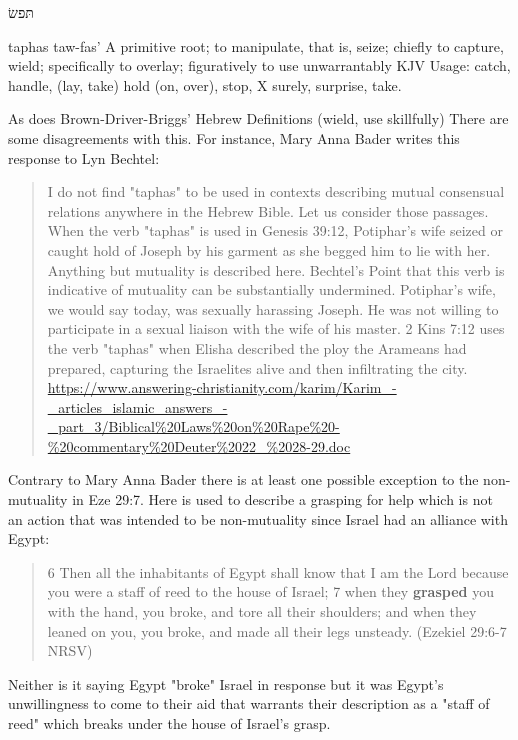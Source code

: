 \documentclass[11pt]{article}
\begin{document}
 \begin{hebrew} תּפשׂ  \end{hebrew}

taphas \newline
taw-fas' \newline
A primitive root; to manipulate, that is, seize; chiefly to capture, wield; specifically to overlay; figuratively to use unwarrantably
\newline
KJV Usage: catch, handle, (lay, take) hold (on, over), stop, X surely, surprise, take. \newline


As does Brown-Driver-Briggs' Hebrew Definitions (wield, use skillfully) There are some disagreements with this. For instance, Mary Anna Bader writes this response to Lyn Bechtel:

\begin{quote}
I do not find "taphas" to be used in contexts describing mutual consensual relations anywhere in the Hebrew Bible. Let us consider those passages. When the verb "taphas" is used in Genesis 39:12, Potiphar's wife seized or caught hold of Joseph by his garment as she begged him to lie with her. Anything but mutuality is described here. Bechtel's Point that this verb is indicative of mutuality can be substantially undermined. Potiphar's wife, we would say today, was sexually harassing Joseph. He was not willing to participate in a sexual liaison with the wife of his master. 2 Kins 7:12 uses the verb "taphas" when Elisha described the ploy the Arameans had prepared, capturing the Israelites alive and then infiltrating the city. 
\url{https://www.answering-christianity.com/karim/Karim_-_articles_islamic_answers_-_part_3/Biblical\%20Laws\%20on\%20Rape\%20-\%20commentary\%20Deuter\%2022_\%2028-29.doc}
\end{quote}

Contrary to Mary Anna Bader there is at least one possible exception to the non-mutuality in Eze 29:7. Here is used to describe a grasping for help which is not an action that was intended to be non-mutuality since Israel had an alliance with Egypt:
\begin{quote}
6 Then all the inhabitants of Egypt shall know
    that I am the Lord
because you were a staff of reed
    to the house of Israel;
7 when they \textbf{grasped} you with the hand, you broke,
    and tore all their shoulders;
and when they leaned on you, you broke,
    and made all their legs unsteady.
    (Ezekiel 29:6-7 NRSV)
\end{quote}
Neither is it saying Egypt "broke" Israel in response but it was Egypt's unwillingness to come to their aid that warrants their description as a "staff of reed" which breaks under the house of Israel's grasp. 
\end{document}
